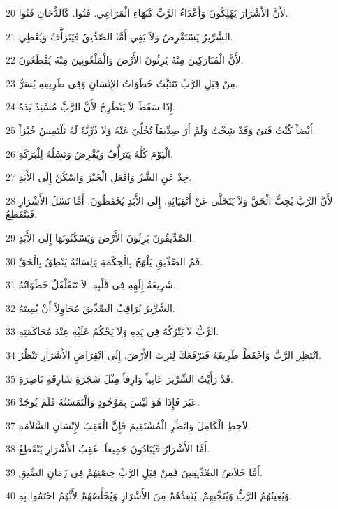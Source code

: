 \par 20 لأَنَّ الأَشْرَارَ يَهْلِكُونَ وَأَعْدَاءُ الرَّبِّ كَبَهَاءِ الْمَرَاعِي. فَنُوا. كَالدُّخَانِ فَنُوا.
\par 21 الشِّرِّيرُ يَسْتَقْرِضُ وَلاَ يَفِي أَمَّا الصِّدِّيقُ فَيَتَرَأَّفُ وَيُعْطِي.
\par 22 لأَنَّ الْمُبَارَكِينَ مِنْهُ يَرِثُونَ الأَرْضَ وَالْمَلْعُونِينَ مِنْهُ يُقْطَعُونَ.
\par 23 مِنْ قِبَلِ الرَّبِّ تَتَثَبَّتُ خَطَوَاتُ الإِنْسَانِ وَفِي طَرِيقِهِ يُسَرُّ.
\par 24 إِذَا سَقَطَ لاَ يَنْطَرِحُ لأَنَّ الرَّبَّ مُسْنِدٌ يَدَهُ.
\par 25 أَيْضاً كُنْتُ فَتىً وَقَدْ شِخْتُ وَلَمْ أَرَ صِدِّيقاً تُخُلِّيَ عَنْهُ وَلاَ ذُرِّيَّةً لَهُ تَلْتَمِسُ خُبْزاً.
\par 26 الْيَوْمَ كُلَّهُ يَتَرَأَّفُ وَيُقْرِضُ وَنَسْلُهُ لِلْبَرَكَةِ.
\par 27 حِدْ عَنِ الشَّرِّ وَافْعَلِ الْخَيْرَ وَاسْكُنْ إِلَى الأَبَدِ.
\par 28 لأَنَّ الرَّبَّ يُحِبُّ الْحَقَّ وَلاَ يَتَخَلَّى عَنْ أَتْقِيَائِهِ. إِلَى الأَبَدِ يُحْفَظُونَ. أَمَّا نَسْلُ الأَشْرَارِ فَيَنْقَطِعُ.
\par 29 الصِّدِّيقُونَ يَرِثُونَ الأَرْضَ وَيَسْكُنُونَهَا إِلَى الأَبَدِ.
\par 30 فَمُ الصِّدِّيقِ يَلْهَجُ بِالْحِكْمَةِ وَلِسَانُهُ يَنْطِقُ بِالْحَقِّ.
\par 31 شَرِيعَةُ إِلَهِهِ فِي قَلْبِهِ. لاَ تَتَقَلْقَلُ خَطَوَاتُهُ.
\par 32 الشِّرِّيرُ يُرَاقِبُ الصِّدِّيقَ مُحَاوِلاً أَنْ يُمِيتَهُ.
\par 33 الرَّبُّ لاَ يَتْرُكُهُ فِي يَدِهِ وَلاَ يَحْكُمُ عَلَيْهِ عِنْدَ مُحَاكَمَتِهِ.
\par 34 انْتَظِرِ الرَّبَّ وَاحْفَظْ طَرِيقَهُ فَيَرْفَعَكَ لِتَرِثَ الأَرْضَ. إِلَى انْقِرَاضِ الأَشْرَارِ تَنْظُرُ.
\par 35 قَدْ رَأَيْتُ الشِّرِّيرَ عَاتِياً وَارِفاً مِثْلَ شَجَرَةٍ شَارِقَةٍ نَاضِرَةٍ.
\par 36 عَبَرَ فَإِذَا هُوَ لَيْسَ بِمَوْجُودٍ وَالْتَمَسْتُهُ فَلَمْ يُوجَدْ.
\par 37 لاَحِظِ الْكَامِلَ وَانْظُرِ الْمُسْتَقِيمَ فَإِنَّ الْعَقِبَ لإِنْسَانِ السَّلاَمَةِ.
\par 38 أَمَّا الأَشْرَارُ فَيُبَادُونَ جَمِيعاً. عَقِبُ الأَشْرَارِ يَنْقَطِعُ.
\par 39 أَمَّا خَلاَصُ الصِّدِّيقِينَ فَمِنْ قِبَلِ الرَّبِّ حِصْنِهُمْ فِي زَمَانِ الضِّيقِ.
\par 40 وَيُعِينُهُمُ الرَّبُّ وَيُنَجِّيهِمْ. يُنْقِذُهُمْ مِنَ الأَشْرَارِ وَيُخَلِّصُهُمْ لأَنَّهُمُ احْتَمُوا بِهِ.

